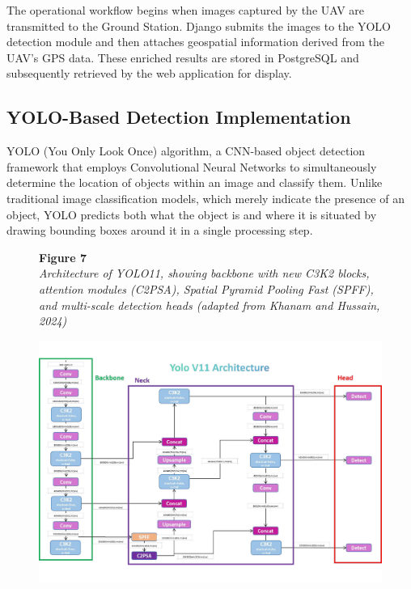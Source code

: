 The operational workflow begins when images captured by the UAV are transmitted to the Ground Station. Django submits the images to the YOLO detection module and then attaches geospatial information derived from the UAV’s GPS data. These enriched results are stored in PostgreSQL and subsequently retrieved by the web application for display.

\subsection{YOLO-Based Detection Implementation}
YOLO (You Only Look Once) algorithm, a CNN-based object detection framework that employs Convolutional Neural Networks to simultaneously determine the location of objects within an image and classify them. Unlike traditional image classification models, which merely indicate the presence of an object, YOLO predicts both what the object is and where it is situated by drawing bounding boxes around it in a single processing step.

\begin{figure}[H]
  \raggedright
  \textbf{Figure 7} \\ 
  \textit{Architecture of YOLO11, showing backbone with new C3K2 blocks, attention modules (C2PSA), Spatial Pyramid Pooling Fast (SPFF), and multi-scale detection heads (adapted from Khanam and Hussain, 2024)} 

  \vspace{0.5em}
  \centering
  \includegraphics[width=1\textwidth]{figures/yolov11.pdf}  

  \vspace{0.5em}
  \raggedright

  \label{fig:yolov11_architecture}
\end{figure}


